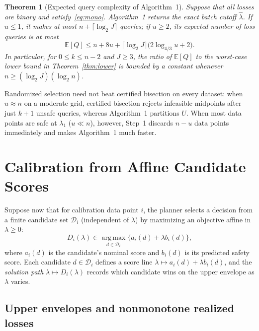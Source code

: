 \documentclass[a4paper,10pt]{article}
\theoremstyle{plain}
\newtheorem{theorem}{Theorem}[section]
\theoremstyle{remark}
\begin{document}
\begin{theorem}[Expected query complexity of Algorithm~1]\label{thm:upper}
Suppose that all losses are binary and satisfy~\eqref{eq:mono}. Algorithm~1 returns the exact batch cutoff $\widehat\lambda$. If $u\le1$, it makes at most $n+\lceil\log_2 J\rceil$ queries; if $u\ge2$, its expected number of loss queries is at most
\begin{equation}\label{eq:upper}
 \mathbb E[Q]\le n+8u+\lceil\log_2 J\rceil\bigl(2\log_{4/3}u+2\bigr).
\end{equation}
In particular, for $0\le k\le n-2$ and $J\ge3$, the ratio of $\mathbb E[Q]$ to the worst-case lower bound in Theorem~\ref{thm:lower} is bounded by a constant whenever $n\ge(\log_2 J)(\log_2 n)$.
\end{theorem}

Randomized selection need not beat certified bisection on every dataset: when $u\approx n$ on a moderate grid, certified bisection rejects infeasible midpoints after just $k+1$ unsafe queries, whereas Algorithm~1 partitions $U$. When most data points are safe at $\lambda_1$ ($u\ll n$), however, Step~1 discards $n-u$ data points immediately and makes Algorithm~1 much faster.

\section{Calibration from Affine Candidate Scores}\label{sec:affine}

Suppose now that for calibration data point $i$, the planner selects a decision from a finite candidate set $\mathcal D_i$ (independent of $\lambda$) by maximizing an objective affine in $\lambda\ge0$:
\begin{equation}\label{eq:affine}
 D_i(\lambda)\in\operatorname*{arg\,max}_{d\in\mathcal D_i}
 \bigl\{a_i(d)+\lambda b_i(d)\bigr\},
\end{equation}
where $a_i(d)$ is the candidate's nominal score and $b_i(d)$ is its predicted safety score. Each candidate $d\in\mathcal D_i$ defines a score line $\lambda\mapsto a_i(d)+\lambda b_i(d)$, and the \emph{solution path} $\lambda\mapsto D_i(\lambda)$ records which candidate wins on the upper envelope as $\lambda$ varies.

\subsection{Upper envelopes and nonmonotone realized losses}\label{sec:hull}
\end{document}
